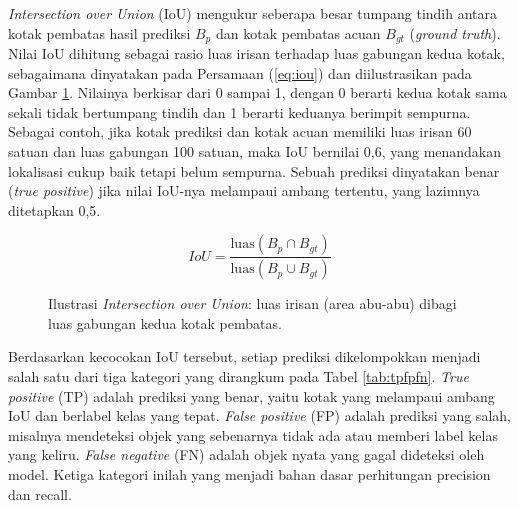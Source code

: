 \textit{Intersection over Union} (IoU) mengukur seberapa besar tumpang tindih antara kotak 
pembatas hasil prediksi $B_{p}$ dan kotak pembatas acuan $B_{gt}$ (\textit{ground truth}). 
Nilai IoU dihitung sebagai rasio luas irisan terhadap luas gabungan kedua kotak, 
sebagaimana dinyatakan pada Persamaan (\ref{eq:iou}) dan diilustrasikan pada Gambar 
\ref{fig:iou}. Nilainya berkisar dari 0 sampai 1, dengan 0 berarti kedua kotak sama sekali 
tidak bertumpang tindih dan 1 berarti keduanya berimpit sempurna. Sebagai contoh, jika kotak 
prediksi dan kotak acuan memiliki luas irisan 60 satuan dan luas gabungan 100 satuan, maka 
IoU bernilai 0,6, yang menandakan lokalisasi cukup baik tetapi belum sempurna. Sebuah 
prediksi dinyatakan benar (\textit{true positive}) jika nilai IoU-nya melampaui ambang 
tertentu, yang lazimnya ditetapkan 0,5.

\begin{equation}
    \mathit{IoU} = \frac{\text{luas}(B_{p} \cap B_{gt})}{\text{luas}(B_{p} \cup B_{gt})}
    \label{eq:iou}
\end{equation}

\begin{figure}[h]
    \centering
    \caption{Ilustrasi \textit{Intersection over Union}: luas irisan (area abu-abu) dibagi luas gabungan kedua kotak pembatas.}
    \label{fig:iou}
\end{figure}

Berdasarkan kecocokan IoU tersebut, setiap prediksi dikelompokkan menjadi salah satu dari 
tiga kategori yang dirangkum pada Tabel \ref{tab:tpfpfn}. \textit{True positive} (TP) adalah 
prediksi yang benar, yaitu kotak yang melampaui ambang IoU dan berlabel kelas yang tepat. 
\textit{False positive} (FP) adalah prediksi yang salah, misalnya mendeteksi objek yang 
sebenarnya tidak ada atau memberi label kelas yang keliru. \textit{False negative} (FN) 
adalah objek nyata yang gagal dideteksi oleh model. Ketiga kategori inilah yang menjadi 
bahan dasar perhitungan precision dan recall.

